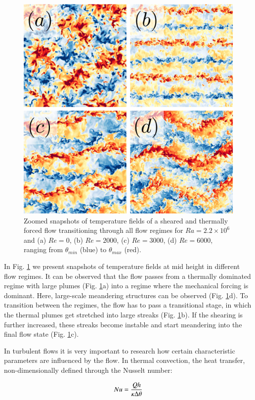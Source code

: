 \documentclass[5p,times]{elsarticle}
\begin{document}
\begin{figure}
	\centering
	\includegraphics[width=0.8\linewidth]{squaredoverview}%
	\caption{\label{fig:overview} Zoomed snapshots of temperature fields
of a sheared and thermally forced flow transitioning through all flow regimes
for $ Ra=2.2 \times 10^6 $ and (a) $ Re=0 $, (b) $ Re=2000 $, (c) $ Re=3000 $, (d) $ Re=6000 $, ranging from $ \theta_{min} $ (blue) to $ \theta_{max} $ (red).}
\end{figure}

In Fig. \ref{fig:overview} we present snapshots of temperature
fields at mid height in different flow regimes. It can be observed that the flow passes from a
thermally dominated regime with large plumes (Fig. \ref{fig:overview}a) into a
regime where the mechanical forcing is dominant. Here, large-scale meandering
structures can be observed (Fig. \ref{fig:overview}d). To transition between the
regimes, the flow has to pass a transitional stage, in which the thermal plumes
get stretched into large streaks (Fig. \ref{fig:overview}b). If the shearing is
further increased, these streaks become instable and start meandering into the
final flow state (Fig. \ref{fig:overview}c).

In turbulent flows it is very important to research how certain characteristic
parameters are influenced by the flow. In thermal convection, the heat transfer, non-dimensionally
defined through the Nusselt number:

\begin{equation} %
Nu= \frac{Qh}{\kappa \Delta \theta}
\label{eqn:nusselt} \\[8pt]
\end{equation} 
\end{document}
